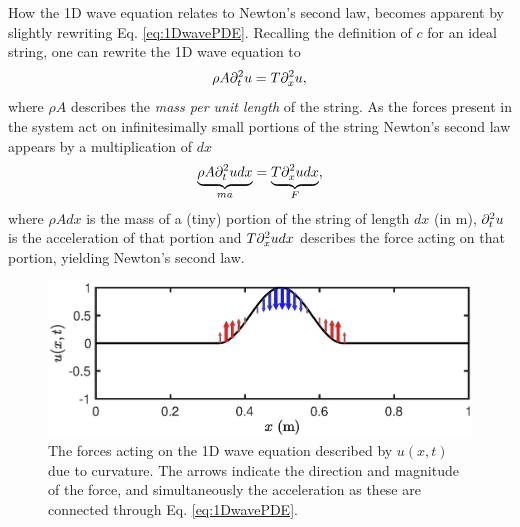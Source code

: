 How the 1D wave equation relates to Newton's second law, becomes apparent by slightly rewriting Eq. \eqref{eq:1DwavePDE}. Recalling the definition of $c$ for an ideal string, one can rewrite the 1D wave equation to
\begin{equation*}
    \rho A \partial_t^2 u = T \partial_x^2 u,
\end{equation*}
where $\rho A$ describes the \textit{mass per unit length} of the string. As the forces present in the system act on infinitesimally small portions of the string Newton's second law appears by a multiplication of $dx$
\begin{equation*}
    \underbrace{\rho A \partial_t^2 u dx}_{ma} = \underbrace{T \partial_x^2 u dx}_{F},
\end{equation*}
where $\rho A dx$ is the mass of a (tiny) portion of the string of length $dx$ (in m), $\partial_t^2 u$ is the acceleration of that portion and $T \partial_x^2 u dx$ describes the force acting on that portion, yielding Newton's second law.  

\begin{figure}[h]
    \centering
    \includegraphics[width=\textwidth]{figures/fdtd/curvature.eps}
    \caption{\label{fig:curvature} The forces acting on the 1D wave equation described by $u(x,t)$ due to curvature. The arrows indicate the direction and magnitude of the force, and simultaneously the acceleration as these are connected through Eq. \eqref{eq:1DwavePDE}.}
\end{figure}


